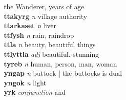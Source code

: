 the Wanderer, years of age\\\textbf{ttakyrg}   \emph{n} \textperiodcentered village authority\\\textbf{ttarkaset}   \emph{n} \textperiodcentered liver\\\textbf{ttfysh}   \emph{n} \textperiodcentered rain, raindrop\\\textbf{ttla}   \emph{n} \textperiodcentered beauty, beautiful things\\\textbf{ttlyttla}   \emph{adj} \textperiodcentered beautiful, stunning\\\textbf{tyreb}   \emph{n} \textperiodcentered human, person, man, woman\\\textbf{yngap}   \emph{n} \textperiodcentered buttock | the buttocks is dual\\\textbf{yngok}   \emph{n} \textperiodcentered light\\\textbf{yrk}   \emph{conjunction} \textperiodcentered and\\